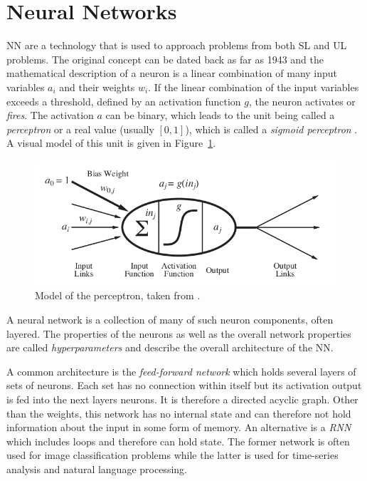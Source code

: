 \section{Neural Networks}%
\label{sec:neural_networks}



\acl {NN} are a technology that is used to approach problems from both \ac{SL} and \ac{UL} problems. The original
concept can be dated back as far as 1943 \cite[p.727]{russell2016artificial} and the mathematical description of a
neuron is a linear combination of many input variables $a_i$ and their weights $w_i$. If the linear combination of the
input variables exceeds a threshold, defined by an activation function $g$, the neuron activates or \emph{fires}.  The
activation $a$ can be binary, which leads to the unit being called a \emph{perceptron} or a real value (usually
$[0,1]$), which is called a \emph{sigmoid perceptron} \cite[p.729]{russell2016artificial}. A visual model of this unit
is given in Figure~\ref{fig:perceptron}.

\begin{figure}[]
    \centering
    \includegraphics[width=0.8\linewidth]{img/perceptron.png}
    \caption{Model of the perceptron, taken from \cite[]{russell2016artificial}.}
    \label{fig:perceptron}
\end{figure}

A neural network is a collection of many of such neuron components, often layered. The properties of the neurons as well
as the overall network properties are called \emph{hyperparameters} and describe the overall architecture of the \ac{NN}.

A common architecture is the \emph{feed-forward network} which holds several layers of sets of neurons. Each set has no
connection within itself but its activation output is fed into the next layers neurons. It is therefore a directed
acyclic graph. Other than the weights, this network has no internal state and can therefore not hold information about
the input in some form of memory. An alternative is a \emph{\acl {RNN} } which includes loops and therefore can
hold state. The former network is often used for image classification problems while the latter is used for
time-series analysis and natural language processing.

